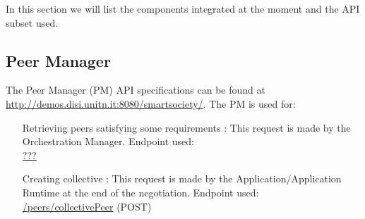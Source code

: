In this section we will list the components integrated at the moment and the API subset used.

\subsection{Peer Manager}
The Peer Manager (PM) API specifications can be found at \url{http://demos.disi.unitn.it:8080/smartsociety/}. The PM is used for:
\begin{itemize}
\item[Retrieving peers satisfying some requirements]: This request is made by the Orchestration Manager. Endpoint used:\\
	\url{???}
\item[Creating collective]: This request is made by the Application/Application Runtime at the end of the negotiation. Endpoint used:\\
	\url{/peers/collectivePeer} (\textsc{POST})
\end{itemize}
